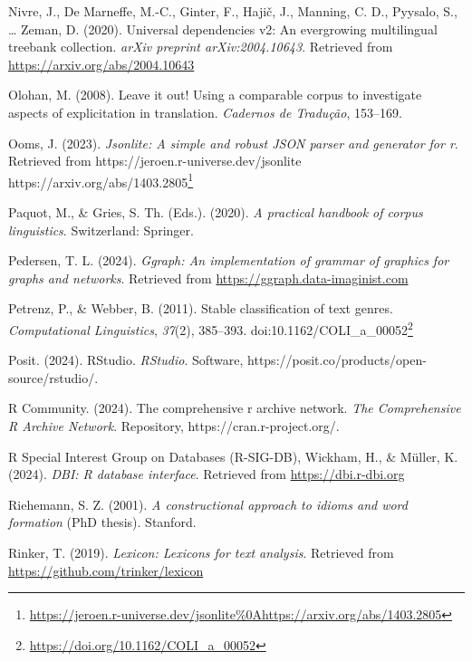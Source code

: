\documentclass[
  letterpaper,
]{book}
\newlength{\cslhangindent}
\newenvironment{CSLReferences}[2] %
 {\begin{list}{}{%
  \setlength{\itemindent}{0pt}
  \setlength{\leftmargin}{0pt}
  \setlength{\parsep}{0pt}
  \ifodd #1
   \setlength{\leftmargin}{\cslhangindent}
   \setlength{\itemindent}{-1\cslhangindent}
  \fi
  \setlength{\itemsep}{#2\baselineskip}}}
 {\end{list}}
\theoremstyle{definition}
\theoremstyle{remark}
\DeclareRobustCommand{\href}[2]{#2\footnote{\url{#1}}}
\begin{document}
\begin{CSLReferences}{1}{0}
Nivre, J., De Marneffe, M.-C., Ginter, F., Hajič, J., Manning, C. D.,
Pyysalo, S., \ldots{} Zeman, D. (2020). Universal dependencies v2: An
evergrowing multilingual treebank collection. \emph{arXiv preprint
arXiv:2004.10643}. Retrieved from \url{https://arxiv.org/abs/2004.10643}

Olohan, M. (2008). Leave it out! Using a comparable corpus to
investigate aspects of explicitation in translation. \emph{Cadernos de
Tradu{ç}{ã}o}, 153--169.

Ooms, J. (2023). \emph{Jsonlite: A simple and robust JSON parser and
generator for r}. Retrieved from
\href{https://jeroen.r-universe.dev/jsonlite\%0Ahttps://arxiv.org/abs/1403.2805}{https://jeroen.r-universe.dev/jsonlite
https://arxiv.org/abs/1403.2805}

Paquot, M., \& Gries, S. Th. (Eds.). (2020). \emph{A practical handbook
of corpus linguistics}. Switzerland: Springer.

Pedersen, T. L. (2024). \emph{Ggraph: An implementation of grammar of
graphics for graphs and networks}. Retrieved from
\url{https://ggraph.data-imaginist.com}

Petrenz, P., \& Webber, B. (2011). Stable classification of text genres.
\emph{Computational Linguistics}, \emph{37}(2), 385--393.
doi:\href{https://doi.org/10.1162/COLI_a_00052}{10.1162/COLI\_a\_00052}

Posit. (2024). RStudio. \emph{RStudio}. Software,
https://posit.co/products/open-source/rstudio/.

R Community. (2024). The comprehensive r archive network. \emph{The
Comprehensive R Archive Network}. Repository,
https://cran.r-project.org/.

R Special Interest Group on Databases (R-SIG-DB), Wickham, H., \&
Müller, K. (2024). \emph{DBI: R database interface}. Retrieved from
\url{https://dbi.r-dbi.org}

Riehemann, S. Z. (2001). \emph{A constructional approach to idioms and
word formation} (PhD thesis). Stanford.

Rinker, T. (2019). \emph{Lexicon: Lexicons for text analysis}. Retrieved
from \url{https://github.com/trinker/lexicon}


\end{CSLReferences}
\end{document}
